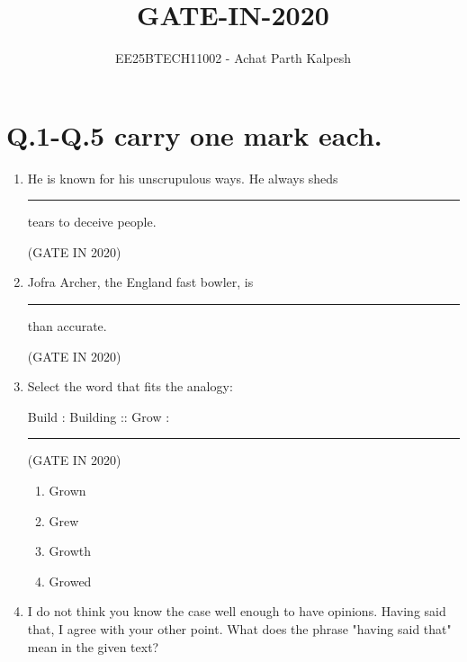 \documentclass[journal,12pt,onecolumn]{IEEEtran}
\title{GATE-IN-2020}
\author{EE25BTECH11002 - Achat Parth Kalpesh }
\date{}
\theoremstyle{remark}
\begin{document}
\maketitle
\section*{Q.1-Q.5 carry one mark each. }

\begin{enumerate}
\item He is known for his unscrupulous ways. He always sheds \rule{2cm}{0.4pt} tears to deceive people.

\hfill{(GATE IN 2020)}
\begin{enumerate}
\end{enumerate}

\item Jofra Archer, the England fast bowler, is \rule{2cm}{0.4pt} than accurate.

\hfill{(GATE IN 2020)}
\begin{enumerate}
\end{enumerate}

\item Select the word that fits the analogy:
\par Build : Building :: Grow : \rule{2cm}{0.4pt}

\hfill{(GATE IN 2020)}
\begin{enumerate}
\item Grown
\item Grew
\item Growth
\item Growed
\end{enumerate}

\item I do not think you know the case well enough to have opinions. Having said that, I agree with your other point.
What does the phrase "having said that" mean in the given text?


\end{enumerate}
\end{document}
